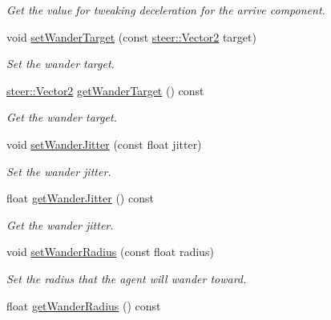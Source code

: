 \begin{DoxyCompactItemize}
\begin{DoxyCompactList}\small\item\em Get the value for tweaking deceleration for the arrive component. \end{DoxyCompactList}\item 
void \hyperlink{classsteer_1_1_agent_a4535a5da819318a0ee8a624c531b1b85}{set\-Wander\-Target} (const \hyperlink{structsteer_1_1_vector2}{steer\-::\-Vector2} target)
\begin{DoxyCompactList}\small\item\em Set the wander target. \end{DoxyCompactList}\item 
\hypertarget{classsteer_1_1_agent_ae09f1e4c1c9bc0db034f8301d826c5d3}{\hyperlink{structsteer_1_1_vector2}{steer\-::\-Vector2} \hyperlink{classsteer_1_1_agent_ae09f1e4c1c9bc0db034f8301d826c5d3}{get\-Wander\-Target} () const }\label{classsteer_1_1_agent_ae09f1e4c1c9bc0db034f8301d826c5d3}

\begin{DoxyCompactList}\small\item\em Get the wander target. \end{DoxyCompactList}\item 
void \hyperlink{classsteer_1_1_agent_adee2526f7be4a3172e1c10f991396ce2}{set\-Wander\-Jitter} (const float jitter)
\begin{DoxyCompactList}\small\item\em Set the wander jitter. \end{DoxyCompactList}\item 
\hypertarget{classsteer_1_1_agent_a05d72edae38d8e73b468af668bbe1d09}{float \hyperlink{classsteer_1_1_agent_a05d72edae38d8e73b468af668bbe1d09}{get\-Wander\-Jitter} () const }\label{classsteer_1_1_agent_a05d72edae38d8e73b468af668bbe1d09}

\begin{DoxyCompactList}\small\item\em Get the wander jitter. \end{DoxyCompactList}\item 
void \hyperlink{classsteer_1_1_agent_a68e2e677a981e66321d85b480e4b9f0f}{set\-Wander\-Radius} (const float radius)
\begin{DoxyCompactList}\small\item\em Set the radius that the agent will wander toward. \end{DoxyCompactList}\item 
\hypertarget{classsteer_1_1_agent_ae2785325858f0d8a933722abb272e517}{float \hyperlink{classsteer_1_1_agent_ae2785325858f0d8a933722abb272e517}{get\-Wander\-Radius} () const }\label{classsteer_1_1_agent_ae2785325858f0d8a933722abb272e517}


\end{DoxyCompactItemize}
